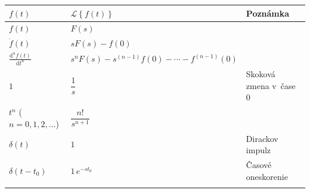 \documentclass[a4paper, 10pt, ]{article}
\begin{document}
\normalsize
\normalfont
















\newcommand{\Laplace}[1]{\ensuremath{\mathcal{L}{\left\{#1\right\}}}}
\newcommand{\InvLap}[1]{\ensuremath{\mathcal{L}^{-1}{\left\{#1\right\}}}}


\noindent
\begin{longtable}[l]{p{3.7cm} @{} p{5.9cm} p{2.8cm}}

    \toprule
    $f(t)$                                  & $\Laplace{f(t)}$   & {\color{Gray} \scriptsize Poznámka} \\
    \midrule
    \addlinespace[5mm]
    \endhead



    $f(t)$                                  & $F(s)$                                \\[4mm]
    $\dot f(t)$                             & $sF(s) - f(0)$                        \\[4mm]
    $\displaystyle \frac{\text{d}^n f(t)}{\text{d}t^n}$                                 & $s^nF(s) - s^{(n-1)} f(0) - \cdots - f^{(n-1)}(0)$ \\[4mm]    
    \midrule \addlinespace[4mm]


    $1$                                     & $\dfrac{1}{s}$                        & {\color{Gray} \scriptsize Skoková zmena v~čase~$0$}  \\[4mm]
    $t^n$ ($n=0,1,2,\dots$)                 & $\dfrac{n!}{s^{n+1}}$                 \\[4mm]
    \midrule \addlinespace[4mm]


    $\delta(t)$                             & $1$                                   & {\color{Gray} \scriptsize Dirackov impulz} \\[4mm]
    $\delta(t-t_0)$                         & $1 \, e^{-st_0}$                      & {\color{Gray} \scriptsize Časové oneskorenie} \\[4mm]
    \midrule \addlinespace[4mm]
        

\end{longtable}
\end{document}
